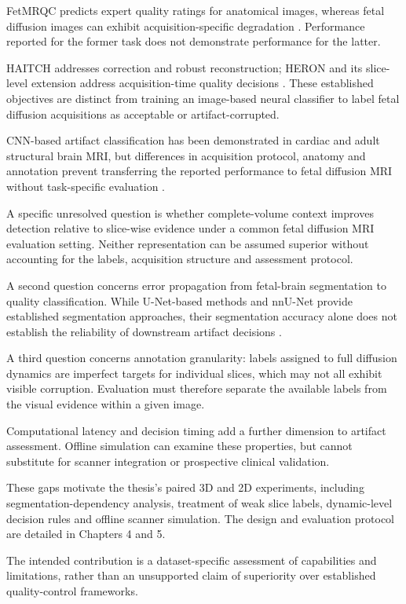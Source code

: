 FetMRQC predicts expert quality ratings for anatomical images, whereas fetal diffusion images can exhibit acquisition-specific degradation \autocite{sanchez2024fetmrqc}. Performance reported for the former task does not demonstrate performance for the latter.

HAITCH addresses correction and robust reconstruction; HERON and its slice-level extension address acquisition-time quality decisions \autocite{snoussi2025haitch,avilesverdera2025heron,avilesverdera2026slicereacquisition}. These established objectives are distinct from training an image-based neural classifier to label fetal diffusion acquisitions as acceptable or artifact-corrupted.

CNN-based artifact classification has been demonstrated in cardiac and adult structural brain MRI, but differences in acquisition protocol, anatomy and annotation prevent transferring the reported performance to fetal diffusion MRI without task-specific evaluation \autocite{oksuz2019cardiac,vakli2023motion,roecher2024motion}.

A specific unresolved question is whether complete-volume context improves detection relative to slice-wise evidence under a common fetal diffusion MRI evaluation setting. Neither representation can be assumed superior without accounting for the labels, acquisition structure and assessment protocol.

A second question concerns error propagation from fetal-brain segmentation to quality classification. While U-Net-based methods and nnU-Net provide established segmentation approaches, their segmentation accuracy alone does not establish the reliability of downstream artifact decisions \autocite{ronneberger2015unet,isensee2021nnunet}.

A third question concerns annotation granularity: labels assigned to full diffusion dynamics are imperfect targets for individual slices, which may not all exhibit visible corruption. Evaluation must therefore separate the available labels from the visual evidence within a given image.

Computational latency and decision timing add a further dimension to artifact assessment. Offline simulation can examine these properties, but cannot substitute for scanner integration or prospective clinical validation.

These gaps motivate the thesis's paired 3D and 2D experiments, including segmentation-dependency analysis, treatment of weak slice labels, dynamic-level decision rules and offline scanner simulation. The design and evaluation protocol are detailed in Chapters 4 and 5.

The intended contribution is a dataset-specific assessment of capabilities and limitations, rather than an unsupported claim of superiority over established quality-control frameworks.